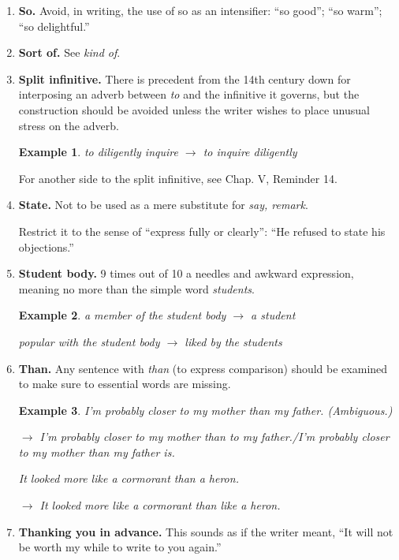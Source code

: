 \documentclass{book}
\numberwithin{equation}{section}
\newtheorem{example}{Example}[chapter]
\begin{document}
\begin{enumerate}
    A suicide puts it the other way: ``I will drown; no one shall save me!''
    
    In relaxed speech, however, the words \textit{shall} and \textit{will} are seldom used precisely; our ear guides us or fails to guide us, as the case may be, and we are quite likely to drown when we want to survive and survive when we want to drown.
    \item \textbf{So.} Avoid, in writing, the use of so as an intensifier: ``so good''; ``so warm''; ``so delightful.''
    \item \textbf{Sort of.} See \textit{kind of}.
    \item \textbf{Split infinitive.} There is precedent from the 14th century down for interposing an adverb between \textit{to} and the infinitive it governs, but the construction should be avoided unless the writer wishes to place unusual stress on the adverb.
    \begin{example}
        to diligently inquire $\to$ to inquire diligently
    \end{example}
    For another side to the split infinitive, see Chap. V, Reminder 14.
    \item \textbf{State.} Not to be used as a mere substitute for \textit{say, remark}.
    
    Restrict it to the sense of ``express fully or clearly'': ``He refused to state his objections.''
    \item \textbf{Student body.} 9 times out of 10 a needles and awkward expression, meaning no more than the simple word \textit{students}.
    \begin{example}
        a member of the student body $\to$ a student
        
        popular with the student body $\to$ liked by the students
    \end{example}
    \item \textbf{Than.} Any sentence with \textit{than} (to express comparison) should be examined to make sure to essential words are missing.
    \begin{example}
        I'm probably closer to my mother than my father. (Ambiguous.)
        
        $\to$ I'm probably closer to my mother than to my father./I'm probably closer to my mother than my father is.
        
        It looked more like a cormorant than a heron.
        
        $\to$ It looked more like a cormorant than like a heron.
    \end{example}
    \item \textbf{Thanking you in advance.} This sounds as if the writer meant, ``It will not be worth my while to write to you again.''
    

\end{enumerate}
\end{document}
